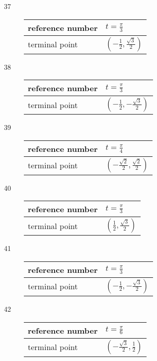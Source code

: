 \documentclass{exam}
\begin{document}
\begin{description}
      \item[37]
        \begin{tabular}[H]{ll}
          \toprule
          reference number & $t = \frac{\pi}{3}$ \\
          \midrule
          terminal point   & $\left( - \frac{1}{2}, \frac{\sqrt{3}}{2} \right)$ \\
          \bottomrule
        \end{tabular}

      \item[38]
        \begin{tabular}[H]{ll}
          \toprule
          reference number & $t = \frac{\pi}{3}$ \\
          \midrule
          terminal point   & $\left( - \frac{1}{2}, - \frac{\sqrt{3}}{2} \right)$ \\
          \bottomrule
        \end{tabular}

      \item[39]
        \begin{tabular}[H]{ll}
          \toprule
          reference number & $t = \frac{\pi}{4}$ \\
          \midrule
          terminal point   & $\left( - \frac{\sqrt{2}}{2}, \frac{\sqrt{2}}{2} \right)$ \\
          \bottomrule
        \end{tabular}

      \item[40]
        \begin{tabular}[H]{ll}
          \toprule
          reference number & $t = \frac{\pi}{3}$ \\
          \midrule
          terminal point   & $\left( \frac{1}{2}, \frac{\sqrt{3}}{2} \right)$ \\
          \bottomrule
        \end{tabular}

      \item[41]
        \begin{tabular}[H]{ll}
          \toprule
          reference number & $t = \frac{\pi}{3}$ \\
          \midrule
          terminal point   & $\left( - \frac{1}{2}, - \frac{\sqrt{3}}{2} \right)$ \\
          \bottomrule
        \end{tabular}

      \item[42]
        \begin{tabular}[H]{ll}
          \toprule
          reference number & $t = \frac{\pi}{6}$ \\
          \midrule
          terminal point   & $\left( - \frac{\sqrt{3}}{2}, \frac{1}{2} \right)$ \\
          \bottomrule
        \end{tabular}


\end{description}
\end{document}
